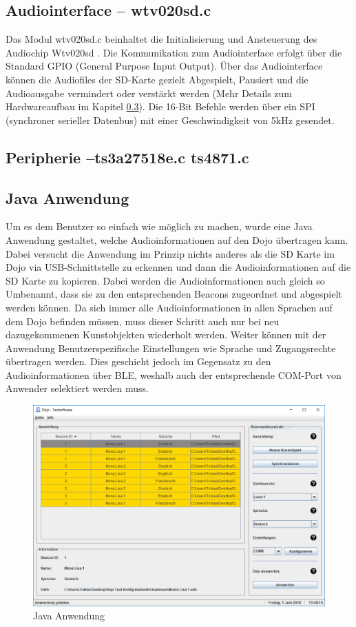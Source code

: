 \subsection{Audiointerface -- wtv020sd.c}
Das Modul wtv020sd.c beinhaltet die Initialisierung und Ansteuerung des Audiochip Wtv020sd \cite{WTV020}. Die Kommunikation zum Audiointerface erfolgt über die Standard GPIO (General Purpose Input Output). Über das Audiointerface können die Audiofiles der SD-Karte gezielt Abgespielt, Pausiert und die Audioausgabe vermindert oder verstärkt werden (Mehr Details zum Hardwareaufbau im Kapitel \ref{}). Die 16-Bit Befehle werden über ein SPI (synchroner serieller Datenbus) mit einer Geschwindigkeit von 5kHz gesendet.


\subsection{Peripherie --ts3a27518e.c ts4871.c}

\subsection{Java Anwendung}

Um es dem Benutzer so einfach wie möglich zu machen, wurde eine Java Anwendung gestaltet, welche Audioinformationen auf den Dojo übertragen kann. Dabei versucht die Anwendung im Prinzip nichts anderes als die SD Karte im Dojo via USB-Schnittstelle zu erkennen und dann die Audioinformationen auf die SD Karte zu kopieren. Dabei werden die Audioinformationen auch gleich so Umbenannt, dass sie zu den entsprechenden Beacons zugeordnet und abgespielt werden können. Da sich immer alle Audioinformationen in allen Sprachen auf dem Dojo befinden müssen, muss dieser Schritt auch nur bei neu dazugekommenen Kunstobjekten wiederholt werden. Weiter können mit der Anwendung Benutzerspezifische Einstellungen wie Sprache und Zugangsrechte übertragen werden. Dies geschieht jedoch im Gegensatz zu den Audioinformationen über BLE, weshalb auch der entsprechende COM-Port von Anwender selektiert werden muss.

\begin{figure}[htb]
	\centering
	\includegraphics[width=\textwidth]{graphics/Java_Anwendung.png}
	\caption{Java Anwendung}
	\label{fig:Java Anwendung}
\end{figure}

